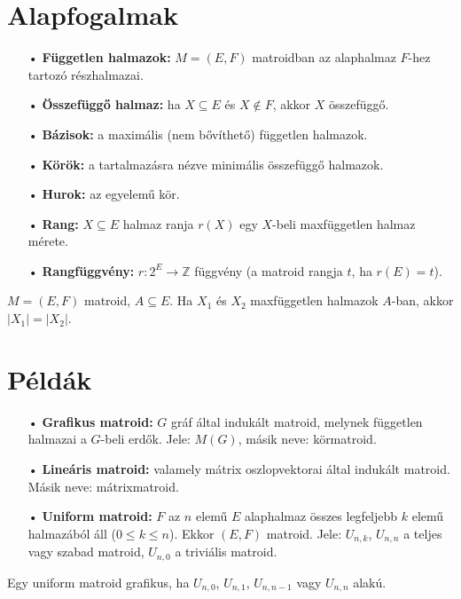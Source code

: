 \section*{Alapfogalmak}
\begin{itemize}
\item[•] \textbf{Független halmazok:} $M=(E,F)$ matroidban az alaphalmaz $F$-hez tartozó részhalmazai.
\item[•] \textbf{Összefüggő halmaz:} ha $X\subseteq E$ és $X\notin F$, akkor $X$ összefüggő.
\item[•] \textbf{Bázisok:} a maximális (nem bővíthető) független halmazok.
\item[•] \textbf{Körök:} a tartalmazásra nézve minimális összefüggő halmazok.
\item[•] \textbf{Hurok:} az egyelemű kör.
\item[•] \textbf{Rang:} $X\subseteq E$ halmaz ranja $r(X)$ egy $X$-beli maxfüggetlen halmaz mérete.
\item[•] \textbf{Rangfüggvény:} $r: 2^{E} \rightarrow \mathbb{Z}$ függvény (a matroid rangja $t$, ha $r(E)=t$).
\end{itemize}

\begin{lem}
$M=(E,F)$ matroid, $A\subseteq E$. Ha $X_{1}$ és $X_{2}$ maxfüggetlen halmazok $A$-ban, akkor $|X_{1}|=|X_{2}|$.
\end{lem}

\section*{Példák}
\begin{itemize}
\item[•] \textbf{Grafikus matroid:} $G$ gráf által indukált matroid, melynek független halmazai a $G$-beli erdők. Jele: $M(G)$, másik neve: körmatroid.
\item[•] \textbf{Lineáris matroid:} valamely mátrix oszlopvektorai által indukált matroid. Másik neve: mátrixmatroid.
\item[•] \textbf{Uniform matroid:} $F$ az $n$ elemű $E$ alaphalmaz összes legfeljebb $k$ elemű halmazából áll ($0\leq k\leq n$). Ekkor $(E,F)$ matroid. Jele: $U_{n,k}$, $U_{n,n}$ a teljes vagy szabad matroid, $U_{n,0}$ a triviális matroid.
\end{itemize}

\begin{theo}
Egy uniform matroid grafikus, ha $U_{n,0}$, $U_{n,1}$, $U_{n,n-1}$ vagy $U_{n,n}$ alakú.
\end{theo}

